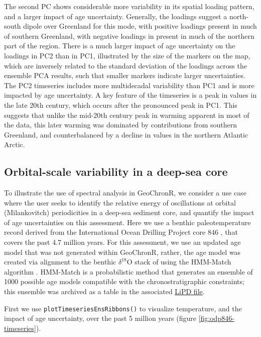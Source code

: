 \documentclass[gchron, manuscript]{copernicus}
\begin{document}
The second PC shows considerable more variability in its spatial loading pattern, and a larger impact of age uncertainty.
Generally, the loadings suggest a north-south dipole over Greenland for this mode, with positive loadings present in much of southern Greenland, with negative loadings in present in much of the northern part of the region.
There is a much larger impact of age uncertainty on the loadings in PC2 than in PC1, illustrated by the size of the markers on the map, which are inversely related to the standard deviation of the loadings across the ensemble PCA results, such that smaller markers indicate larger uncertainties.
The PC2 timeseries includes more multidecadal variability than PC1 and is more impacted by age uncertainty.
A key feature of the timeseries is a peak in values in the late 20th century, which occurs after the pronounced peak in PC1.
This suggests that unlike the mid-20th century peak in warming apparent in most of the data, this later warming was dominated by contributions from southern Greenland, and counterbalanced by a decline in values in the northern Atlantic Arctic.

\hypertarget{sec:spec_vignette}{%
\subsection{Orbital-scale variability in a deep-sea core}\label{sec:spec_vignette}}

To illustrate the use of spectral analysis in GeoChronR, we consider a use case where the user seeks to identify the relative energy of oscillations at orbital (Milankovitch) periodicities in a deep-sea sediment core, and quantify the impact of age uncertainties on this assessment.
Here we use a benthic paleotemperature record derived from the International Ocean Drilling Project core 846 \citep{mix1995benthic, Shackleton95}, that covers the past 4.7 million years.
For this assessment, we use an updated age model that was not generated within GeoChronR, rather, the age model was created via alignment to the benthic \(\delta^{18}\mathrm{O}\) stack of \citet{LisieckiRaymo05} using the HMM-Match algorithm \citep{ProbStack, khider2017}.
HMM-Match is a probabilistic method that generates an ensemble of 1000 possible age models compatible with the chronostratigraphic constraints; this ensemble was archived as a table in the associated \href{http://lipdverse.org/geoChronR-examples/ODP846.Lawrence.2006.lpd}{LiPD file}.

First we use \texttt{plotTimeseriesEnsRibbons()} to visualize temperature, and the impact of age uncertainty, over the past 5 million years (figure \ref{fig:odp846-timeseries}).
\end{document}
